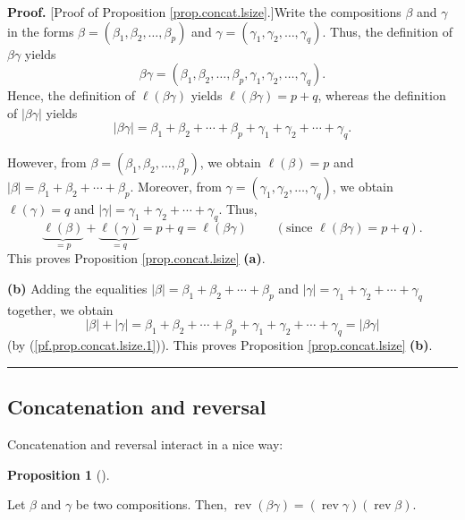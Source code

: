 \documentclass[numbers=enddot,12pt,final,onecolumn,notitlepage]{scrartcl}%
\theoremstyle{definition}
\newtheorem{prop}[theo]{Proposition}
\newenvironment{proposition}[1][]
{\begin{prop}[#1]\begin{leftbar}}
{\end{leftbar}\end{prop}}
\newenvironment{proof}[1][Proof]{\noindent\textbf{#1.} }{\ \rule{0.5em}{0.5em}}
\begin{document}
\begin{proof}
[Proof of Proposition \ref{prop.concat.lsize}.]Write the compositions $\beta$
and $\gamma$ in the forms $\beta=\left(  \beta_{1},\beta_{2},\ldots,\beta
_{p}\right)  $ and $\gamma=\left(  \gamma_{1},\gamma_{2},\ldots,\gamma
_{q}\right)  $. Thus, the definition of $\beta\gamma$ yields%
\[
\beta\gamma=\left(  \beta_{1},\beta_{2},\ldots,\beta_{p},\gamma_{1},\gamma
_{2},\ldots,\gamma_{q}\right)  .
\]
Hence, the definition of $\ell\left(  \beta\gamma\right)  $ yields
$\ell\left(  \beta\gamma\right)  =p+q$, whereas the definition of $\left\vert
\beta\gamma\right\vert $ yields
\begin{equation}
\left\vert \beta\gamma\right\vert =\beta_{1}+\beta_{2}+\cdots+\beta_{p}%
+\gamma_{1}+\gamma_{2}+\cdots+\gamma_{q}. \label{pf.prop.concat.lsize.1}%
\end{equation}


However, from $\beta=\left(  \beta_{1},\beta_{2},\ldots,\beta_{p}\right)  $,
we obtain $\ell\left(  \beta\right)  =p$ and $\left\vert \beta\right\vert
=\beta_{1}+\beta_{2}+\cdots+\beta_{p}$. Moreover, from $\gamma=\left(
\gamma_{1},\gamma_{2},\ldots,\gamma_{q}\right)  $, we obtain $\ell\left(
\gamma\right)  =q$ and $\left\vert \gamma\right\vert =\gamma_{1}+\gamma
_{2}+\cdots+\gamma_{q}$. Thus,%
\[
\underbrace{\ell\left(  \beta\right)  }_{=p}+\underbrace{\ell\left(
\gamma\right)  }_{=q}=p+q=\ell\left(  \beta\gamma\right)
\ \ \ \ \ \ \ \ \ \ \left(  \text{since }\ell\left(  \beta\gamma\right)
=p+q\right)  .
\]
This proves Proposition \ref{prop.concat.lsize} \textbf{(a)}. \medskip

\textbf{(b)} Adding the equalities $\left\vert \beta\right\vert =\beta
_{1}+\beta_{2}+\cdots+\beta_{p}$ and $\left\vert \gamma\right\vert =\gamma
_{1}+\gamma_{2}+\cdots+\gamma_{q}$ together, we obtain
\[
\left\vert \beta\right\vert +\left\vert \gamma\right\vert =\beta_{1}+\beta
_{2}+\cdots+\beta_{p}+\gamma_{1}+\gamma_{2}+\cdots+\gamma_{q}=\left\vert
\beta\gamma\right\vert
\]
(by (\ref{pf.prop.concat.lsize.1})). This proves Proposition
\ref{prop.concat.lsize} \textbf{(b)}.
\end{proof}

\subsection{Concatenation and reversal}

Concatenation and reversal interact in a nice way:

\begin{proposition}
\label{prop.concat.rev}Let $\beta$ and $\gamma$ be two compositions. Then,
$\operatorname*{rev}\left(  \beta\gamma\right)  =\left(  \operatorname*{rev}%
\gamma\right)  \left(  \operatorname*{rev}\beta\right)  $.
\end{proposition}
\end{document}
